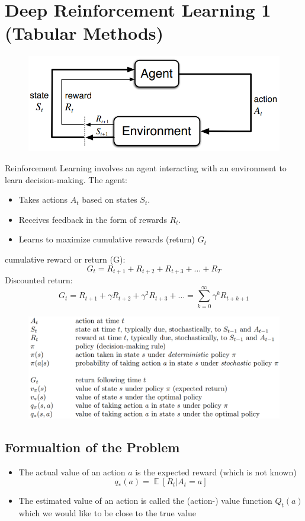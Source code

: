 \section{Deep Reinforcement Learning 1 (Tabular Methods)}
\begin{figure}[!h]
    \includegraphics[width = 0.8\columnwidth]{figures/DeepReinforcementLearning1/EnvironmentAgent.png}
\end{figure}

Reinforcement Learning involves an agent interacting with an environment to learn decision-making. The agent:
\begin{itemize}
    \item Takes actions $A_t$ based on states $S_t$.
    \item Receives feedback in the form of rewards $R_t$.
    \item Learns to maximize cumulative rewards (return) $G_t$
\end{itemize}
cumulative reward or return (G):
\[
G_t = R_{t+1} + R_{t+2} + R_{t+3} + \dots + R_T
\]
Discounted return:
\[
G_t = R_{t+1} + \gamma R_{t+2} +\gamma^2 R_{t+3} + \dots = \sum_{k=0}^{\infty}\gamma^k R_{t+k+1}
\]
\begin{figure}[!h]
    \includegraphics[width = \columnwidth]{figures/DeepReinforcementLearning1/OverviewNotation.png}
\end{figure}
\subsection{Formualtion of the Problem}
\begin{itemize}
    \item The actual value of an action \(a\) is the expected reward (which is not known)
    \[
    q_*(a) = \mathop{\mathbb{E}}[R_t|A_t = a]
    \]
    \item The estimated value of an action is called the (action-) value function \(Q_t(a)\) which we would like to be close to the true value
\end{itemize}
